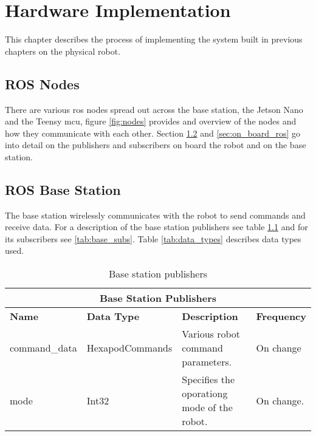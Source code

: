 \chapter{Hardware Implementation} \label{chap:hardware}
This chapter describes the process of implementing the system built in previous chapters on the physical robot. 

\section{ROS Nodes}
There are various ros nodes spread out across the base station, the Jetson Nano and the Teensy \ac{mcu}, figure \ref{fig:nodes} provides and overview
of the nodes and how they communicate with each other. Section \ref{sec:base_ros} and \ref{sec:on_board_ros} go into detail on the publishers and subscribers
on board the robot and on the base station.

\newpage
\section{ROS Base Station} \label{sec:base_ros}
    The base station wirelessly communicates with the robot to send commands and receive data.
    For a description of the base station publishers see table \ref{tab:base_pubs} and for its subscribers see \ref{tab:base_subs}. Table \ref{tab:data_types} describes
    data types used.
    \begin{table}[h]
        \centering
        \begin{tabularx}{\textwidth}{| l | l | X | l |}
            \hline
            \multicolumn{4}{|c|}{\textbf{Base Station Publishers}} \\ \hline
            \textbf{Name} & \textbf{Data Type} & \textbf{Description} & \textbf{Frequency} \\ \hline
            command\_data & HexapodCommands & Various robot command parameters. & On change \\ \hline
            mode & Int32 & Specifies the oporationg mode of the robot. & On change. \\ \hline
        \end{tabularx}
        \caption{Base station publishers}
        \label{tab:base_pubs}
    \end{table}
    
